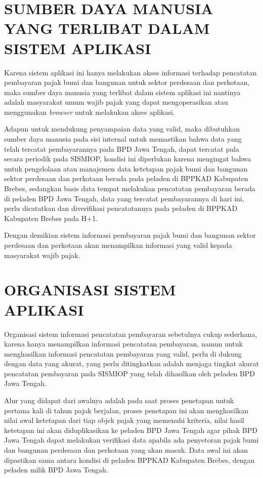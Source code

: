\documentclass[pdftex,12pt, oneside]{article}
\begin{document}
\section{SUMBER DAYA MANUSIA YANG TERLIBAT DALAM SISTEM APLIKASI}

Karena sistem aplikasi ini hanya melakukan akses informasi terhadap pencatatan pembayaran pajak bumi dan bangunan untuk sektor perdesaan dan perkotaan, maka sumber daya manusia yang terlibat dalam sistem aplikasi ini nantinya adalah masyarakat umum wajib pajak yang dapat mengoperasikan atau menggunakan \textit{browser} untuk melakukan akses aplikasi.

Adapun untuk mendukung penyampaian data yang valid, maka dibutuhkan sumber daya manusia pada sisi internal untuk memastikan bahwa data yang telah tercatat pembayarannya pada BPD Jawa Tengah, dapat tercatat pula secara periodik pada SISMIOP, kondisi ini diperlukan karena mengingat bahwa untuk pengelolaan atau manajemen data ketetapan pajak bumi dan bangunan sektor perdesaan dan perkotaan berada pada peladen di BPPKAD Kabupaten Brebes, sedangkan basis data tempat melakukan pencatatan pembayaran berada di peladen BPD Jawa Tengah, data yang tercatat pembayarannya di hari ini, perlu dicatatkan dan diverifikasi pencatatannya pada peladen di BPPKAD Kabupaten Brebes pada H+1.

Dengan demikian sistem informasi pembayaran pajak bumi dan bangunan sektor perdesaan dan perkotaan akan menampilkan informasi yang valid kepada masyarakat wajib pajak. 

\section{ORGANISASI SISTEM APLIKASI}

Organisasi sistem informasi pencatatan pembayaran sebetulnya cukup sederhana, karena hanya menampilkan informasi pencatatan pembayaran, namun untuk menghasilkan informasi pencatatan pembayaran yang valid, perlu di dukung dengan data yang akurat, yang perlu ditingkatkan adalah menjaga tingkat akurat pencatatan pembayaran pada SISMIOP yang telah dihasilkan oleh peladen BPD Jawa Tengah.

Alur yang didapat dari awalnya adalah pada saat proses penetapan untuk pertama kali di tahun pajak berjalan, proses penetapan ini akan menghasilkan nilai awal ketetapan dari tiap objek pajak yang memenuhi kriteria, nilai hasil ketetapan ini akan diduplikasikan ke peladen BPD Jawa Tengah agar pihak BPD Jawa Tengah dapat melakukan verifikasi data apabila ada penyetoran pajak bumi dan bangunan perdesaan dan perkotaan yang akan masuk. Data awal ini akan dipastikan sama antara kondisi di peladen BPPKAD Kabupaten Brebes, dengan peladen milik BPD Jawa Tengah.
\end{document}
